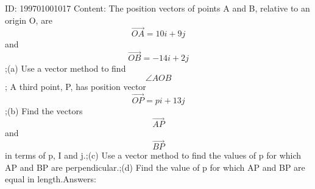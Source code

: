 \documentclass{article}
\begin{document}
ID: 199701001017
Content:
The position vectors of points A and B, relative to an origin O, are \[\vec{OA}=10i+9j\] and \[\vec{OB}=-14i+2j\];(a)	Use a vector method to find  \[\angle AOB\]; A third point, P, has position vector \[\vec{OP}=pi+13j\];(b)	Find the vectors \[\vec{AP}\] and \[\vec{BP}\]in terms of p, I and j.;(c)	Use a vector method to find the values of p for which AP and BP are perpendicular.;(d)	Find the value of p for which AP and BP are equal in length.Answers:
\end{document}
